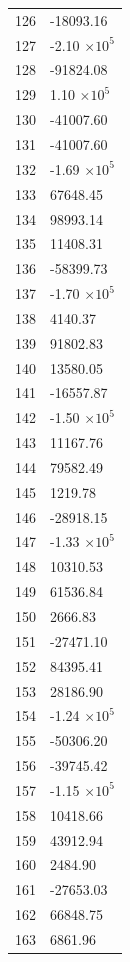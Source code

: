 \documentclass[a4paper,11pt]{article}
\begin{document}
\begin{center}
\begin{longtable}{|R{1.5cm}|R{2.5cm}|}
  126 &    -18093.16 \\
  127 &        -2.10 $\times 10^{           5}$ \\
  128 &    -91824.08 \\
  129 &         1.10 $\times 10^{           5}$ \\
  130 &    -41007.60 \\
  131 &    -41007.60 \\
  132 &        -1.69 $\times 10^{           5}$ \\
  133 &     67648.45 \\
  134 &     98993.14 \\
  135 &     11408.31 \\
  136 &    -58399.73 \\
  137 &        -1.70 $\times 10^{           5}$ \\
  138 &      4140.37 \\
  139 &     91802.83 \\
  140 &     13580.05 \\
  141 &    -16557.87 \\
  142 &        -1.50 $\times 10^{           5}$ \\
  143 &     11167.76 \\
  144 &     79582.49 \\
  145 &      1219.78 \\
  146 &    -28918.15 \\
  147 &        -1.33 $\times 10^{           5}$ \\
  148 &     10310.53 \\
  149 &     61536.84 \\
  150 &      2666.83 \\
  151 &    -27471.10 \\
  152 &     84395.41 \\
  153 &     28186.90 \\
  154 &        -1.24 $\times 10^{           5}$ \\
  155 &    -50306.20 \\
  156 &    -39745.42 \\
  157 &        -1.15 $\times 10^{           5}$ \\
  158 &     10418.66 \\
  159 &     43912.94 \\
  160 &      2484.90 \\
  161 &    -27653.03 \\
  162 &     66848.75 \\
  163 &      6861.96 \\

\end{longtable}
\end{center}
\end{document}
